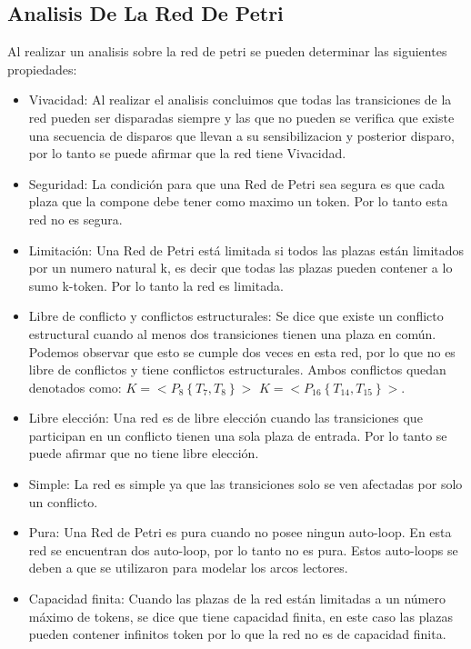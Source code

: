 \documentclass{article}
\begin{document}
	\subsection{Analisis De La Red De Petri}
	Al realizar un analisis sobre la red de petri se pueden determinar las siguientes propiedades:
	\begin{itemize}
		\item Vivacidad: Al realizar el analisis concluimos que todas las transiciones 
		de la red pueden ser disparadas siempre y las que no pueden se verifica que 
		existe una secuencia de disparos que llevan a su sensibilizacion y posterior 
		disparo, por lo tanto se puede afirmar que la red tiene Vivacidad.
		\item Seguridad: La condición para que una Red de Petri sea segura es que cada 
		plaza que la compone debe tener como maximo un token. Por lo tanto esta red no es segura.
		\item Limitación: Una Red de Petri está limitada si todos las plazas están limitados por 
		un numero natural k, es decir que todas las plazas pueden contener a lo sumo k-token. 
		Por lo tanto la red es limitada.
		\item Libre de conflicto y conflictos estructurales: Se dice que existe un conflicto 
		estructural cuando al menos dos transiciones tienen una plaza en común. Podemos 
		observar que esto se cumple dos veces en esta red, por lo que no es libre de conflictos 
		y tiene conflictos estructurales. Ambos conflictos quedan denotados como:
		$K = < P_{8}\left\lbrace T_{7},T_{8}\right\rbrace >$
		$K = < P_{16}\left\lbrace T_{14},T_{15}\right\rbrace >$.
		\item Libre elección: Una red es de libre elección cuando las transiciones 
		que participan en un conflicto tienen una sola plaza de entrada. Por lo 
		tanto se puede afirmar que no tiene libre elección.
		\item Simple: La red es simple ya que las transiciones solo se ven afectadas 
		por solo un conflicto.
		\item Pura: Una Red de Petri es pura cuando no posee ningun auto-loop. En esta 
		red se encuentran dos auto-loop, por lo tanto no es pura. Estos auto-loops se 
		deben a que se utilizaron para modelar los arcos lectores.
		\item Capacidad finita: Cuando las plazas de la red están limitadas a un número 
		máximo de tokens, se dice que tiene capacidad finita, en este caso las plazas 
		pueden contener infinitos token por lo que la red no es de capacidad finita.

\end{itemize}
\end{document}
